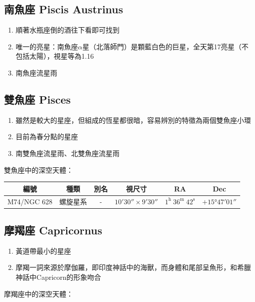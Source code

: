 \subsection{南魚座 Piscis Austrinus}
\begin{enumerate}
    \item 順著水瓶座倒的酒往下看即可找到
    \item 唯一的亮星：南魚座\(\alpha\)星（北落師門）是顆藍白色的巨星，全天第17亮星（不包括太陽），視星等為1.16
    \item 南魚座流星雨
\end{enumerate}

\subsection{雙魚座 Pisces}
\begin{enumerate}
    \item 雖然是較大的星座，但組成的恆星都很暗，容易辨別的特徵為兩個雙魚座小環
    \item 目前為春分點的星座
    \item 南雙魚座流星雨、北雙魚座流星雨
\end{enumerate}
雙魚座中的深空天體：
\newline

\begin{center}
\begin{longtable}{c | c | c | c | c | c}
    編號 & 種類 & 別名 & 視尺寸 & RA & Dec \\
    \hline
    \endfirsthead


    \endfoot

    \endlastfoot

    M74/NGC 628 & 螺旋星系 & - & \(\ang{;10;30}\times\ang{;9;30}\) & \(1^\text{h }36^\text{m }42^\text{s}\) & \(+\ang{15;47;01}\) \\ %
\end{longtable}
\end{center}


\subsection{摩羯座 Capricornus}
\begin{enumerate}
    \item 黃道帶最小的星座
    \item 摩羯一詞來源於摩伽羅，即印度神話中的海獸，而身體和尾部呈魚形，和希臘神話中Capricorn的形象吻合
\end{enumerate}
摩羯座中的深空天體：
\newline

